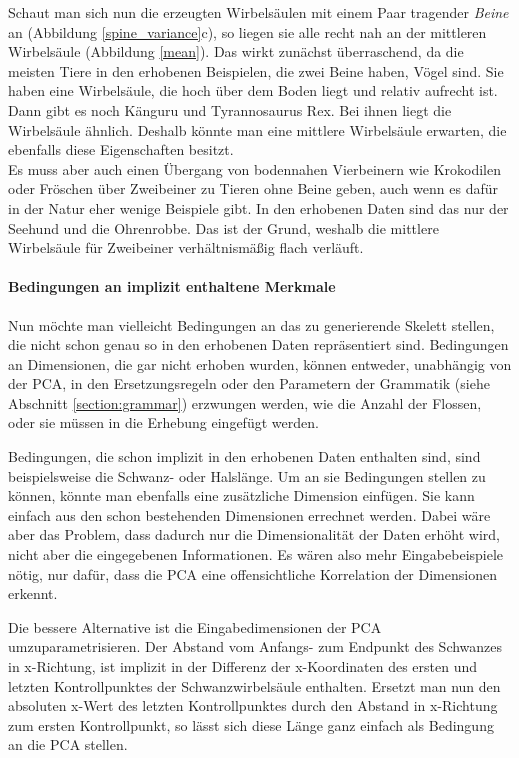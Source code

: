  
 Schaut man sich nun die erzeugten Wirbelsäulen mit einem Paar tragender \emph{Beine} an (Abbildung \ref{spine_variance}c), so liegen sie alle recht nah an der mittleren Wirbelsäule (Abbildung \ref{mean}).
 Das wirkt zunächst überraschend, da die meisten Tiere in den erhobenen Beispielen, die zwei Beine haben, Vögel sind. Sie haben eine Wirbelsäule, die hoch über dem Boden liegt und relativ aufrecht ist. Dann gibt es noch Känguru und Tyrannosaurus Rex. Bei ihnen liegt die Wirbelsäule ähnlich. Deshalb könnte man eine mittlere Wirbelsäule erwarten, die ebenfalls diese Eigenschaften besitzt.\\
 Es muss aber auch einen Übergang von bodennahen Vierbeinern wie Krokodilen oder Fröschen über Zweibeiner zu Tieren ohne Beine geben, auch wenn es dafür in der Natur eher wenige Beispiele gibt. In den erhobenen Daten sind das nur der Seehund und die Ohrenrobbe. Das ist der Grund, weshalb die mittlere Wirbelsäule für Zweibeiner verhältnismäßig flach verläuft.
 
 \paragraph{Bedingungen an implizit enthaltene Merkmale}
 Nun möchte man vielleicht Bedingungen an das zu generierende Skelett stellen, die nicht schon genau so in den erhobenen Daten repräsentiert sind. 
 Bedingungen an Dimensionen, die gar nicht erhoben wurden, können  entweder, unabhängig von der PCA, in den Ersetzungsregeln oder den Parametern der Grammatik (siehe Abschnitt \ref{section:grammar}) erzwungen werden, wie \zb die Anzahl der Flossen, oder sie müssen in die Erhebung eingefügt werden.
 
 Bedingungen, die schon implizit in den erhobenen Daten enthalten sind, sind beispielsweise die Schwanz- oder Halslänge. Um an sie Bedingungen stellen zu können, könnte man ebenfalls eine zusätzliche Dimension einfügen. Sie kann einfach aus den schon bestehenden Dimensionen errechnet werden. Dabei wäre aber das Problem, dass dadurch nur die Dimensionalität der Daten erhöht wird, nicht aber die eingegebenen Informationen. Es wären also mehr Eingabebeispiele nötig, nur dafür, dass die PCA eine offensichtliche Korrelation der Dimensionen erkennt.
 
 Die bessere Alternative ist die Eingabedimensionen der PCA umzuparametrisieren. Der Abstand vom Anfangs- zum Endpunkt des Schwanzes in x-Richtung, ist \zb implizit in der Differenz der x-Koordinaten des ersten und letzten Kontrollpunktes der Schwanzwirbelsäule enthalten. Ersetzt man nun den absoluten x-Wert des letzten Kontrollpunktes durch den Abstand in x-Richtung zum ersten Kontrollpunkt, so lässt sich diese Länge ganz einfach als Bedingung an die PCA stellen. 
 
